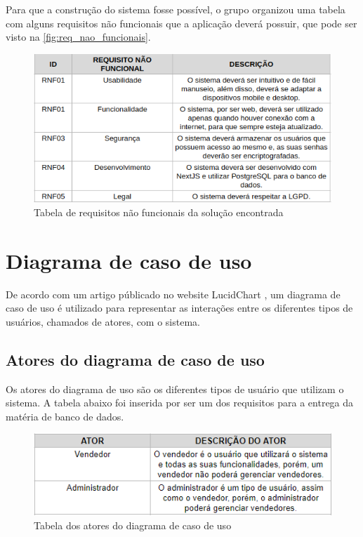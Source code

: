 \documentclass[serif, english, brazilian, oneside]{uffstex}
\begin{document}
Para que a construção do sistema fosse possível, o grupo organizou uma tabela com alguns requisitos não funcionais que a aplicação deverá possuir, que pode ser visto na \autoref{fig:req_nao_funcionais}.

\begin{figure}[!htpb]
    \centering
    \caption{Tabela de requisitos não funcionais da solução encontrada}
    \label{fig:req_nao_funcionais}
    \includegraphics[width=\linewidth]{imagens/req_nao_funcionais.png}
\end{figure}

\section{Diagrama de caso de uso}

De acordo com um artigo públicado no website LucidChart \cite{diagrama-de-caso-de-uso}, um diagrama de caso de uso é utilizado para representar as interações entre os diferentes tipos de usuários, chamados de atores, com o sistema.

\subsection{Atores do diagrama de caso de uso}

Os atores do diagrama de uso são os diferentes tipos de usuário que utilizam o sistema. A tabela abaixo foi inserida por ser um dos requisitos para a entrega da matéria de banco de dados.

\begin{figure}[!htpb]
    \centering
    \caption{Tabela dos atores do diagrama de caso de uso}
    \label{fig:atores_caso_uso}
    \includegraphics[width=0.7\linewidth]{imagens/atores_diagrama_caso_uso.png}
\end{figure}
\end{document}
